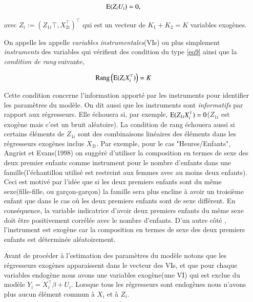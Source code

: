 \begin{align}
	\operatorname{E}(Z_iU_i) &= 0,
\label{eq9}
\end{align}

avec $Z_i:=(Z_{1i}\top, X_{2i}^\top)^\top$ qui est un vecteur de $K_1 + K_2 = K$ variables exogènes.

On appelle les appelle \emph{variables instrumentales}(VIs) ou plus simplement \emph{instruments}
des variables qui vérifient des condition du type \eqref{eq9} ainsi que la \emph{condition de rang} suivante,

\begin{align}
	\mathrm{Rang}\left(\operatorname{E}(Z_iX_i^\top)\right) &= K
	\label{eq10}
\end{align}

Cette condition concerne l'information apporté par les instruments pour identifier les paramètres du modèle. 
On dit aussi que les instruments sont \emph{informatifs} par rapport aux régresseurs. 
Elle échouera si, par exemple, $\operatorname{E}(Z_{1i}X_i^\top) = 0$($Z_{1i}$ est exogène mais c'est un bruit aléatoire). 
La condition de rang échouera aussi si certains éléments de $Z_{1i}$ sont des 
combinaisons linéaires des éléments dans les régresseurs exogènes inclus $X_{2i}$.
Par exemple, pour le cas "Heures/Enfants", Angrist et Evans(1998) on suggéré d'utiliser la composition 
en termes de sexe des deux premier enfants  comme instrument pour le nombre d'enfants dans une 
famille(l'échantillon utilisé est restreint  aux femmes avec au moins deux enfants). 
Ceci est motivé par l'idée que si les deux premiers enfants sont du même sexe(fille-fille, ou garçon-garçon) 
la famille sera plus encline à avoir un troisième enfant que dans le cas où les deux premiers enfants sont 
de sexe différent. En conséquence, la variable indicatrice d'avoir deux premiers enfants du même sexe 
doit être positivement corrélée avec le nombre d'enfants. D'un autre côté , l'instrument est 
exogène car la composition en termes de sexe des deux premiers enfants est déterminée aléatoirement.

Avant de procéder à l'estimation des paramètres du modèle notons que les régresseurs exogènes 
apparaissent dans le vecteur des VIs, 
et que pour chaque variables endogène nous avons une variables exogène(une VI) qui est 
 exclue du modèle $Y_i = X_i^\top\beta +U_i$. Lorsque tous les régresseurs sont endogènes 
 nous n'avons plus aucun élément commun à $X_i$ et à $Z_i$. 

